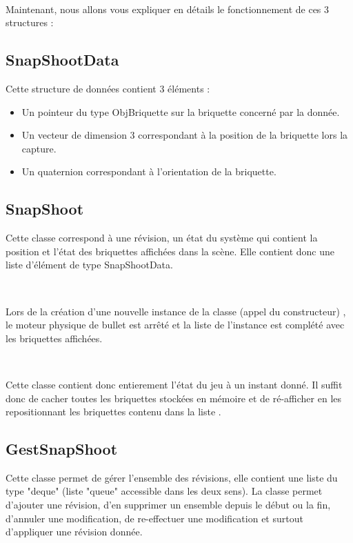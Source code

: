 \documentclass[frenchb,twoside]{EPURapport}
\begin{document}
		\
		
		Maintenant, nous allons vous expliquer en détails le fonctionnement de
		ces 3 structures :
			
			
			\subsection{SnapShootData}
			
			Cette structure de données contient 3 éléments :
			\begin{itemize}
				\item Un pointeur du type ObjBriquette sur la briquette concerné par la donnée.
				\item Un vecteur de dimension 3 correspondant à la position de la briquette lors
				la capture.
				\item Un quaternion correspondant à l'orientation de la briquette.
			\end{itemize}
			
			
			 
			\subsection{SnapShoot}
			
			Cette classe correspond à une révision, un état du système qui contient la position
			et l'état des briquettes affichées dans la scène.
			Elle contient donc une liste d'élément de type SnapShootData.
			
			\
			
			Lors de la création d'une nouvelle instance de la classe (appel du constructeur)
			, le moteur physique de bullet est arrêté et la liste de l'instance est complété
			avec les briquettes affichées.
			
			\
			
			Cette classe contient donc entierement l'état du jeu à un instant donné.
			Il suffit donc de cacher toutes les briquettes stockées en mémoire et de
			ré-afficher en les repositionnant les briquettes contenu dans la liste .
			
		
			\subsection{GestSnapShoot}
			Cette classe permet de gérer l'ensemble des révisions, elle contient
			une liste du type "deque" (liste "queue" accessible dans les deux sens).
			La classe permet d'ajouter une révision, d'en supprimer un ensemble depuis
			le début ou la fin, d'annuler une modification, de re-effectuer une modification
			et surtout d'appliquer une révision donnée.
			 
\end{document}
